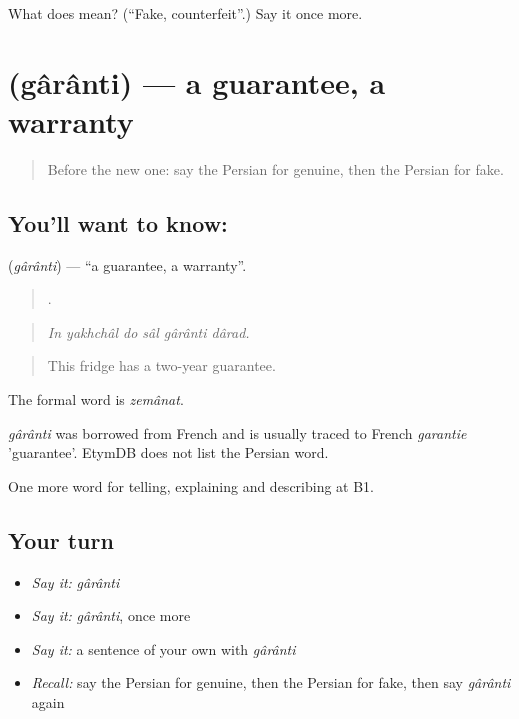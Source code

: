 \begin{tcolorbox}[breakable,colback=teal!4,colframe=teal!35!black,title={Before you move on}]
What does  mean? (\textquotedblleft{}Fake, counterfeit\textquotedblright{}.) Say it once more.
\end{tcolorbox}
\section[\texorpdfstring{\fa{گارانتی} (gârânti)}{گارانتی (gârânti)}]{ (gârânti) — a guarantee, a warranty}

\label{lesson:FA-C459-garanti}



\begin{quote}
Before the new one: say the Persian for genuine, then the Persian for fake.
\end{quote}

\subsection*{You'll want to know: }
\textbf{} (\emph{gârânti}) — \textquotedblleft{}a guarantee, a warranty\textquotedblright{}.

\begin{quote}
     .
\end{quote}

\begin{quote}
\emph{In yakhchâl do sâl gârânti dârad.}
\end{quote}

\begin{quote}
This fridge has a two-year guarantee.
\end{quote}

The formal word is \emph{zemânat}.

\begin{cousinweb}
\emph{gârânti} was borrowed from French and is usually traced to French \emph{garantie} 'guarantee'. EtymDB does not list the Persian word.
\end{cousinweb}

\begin{grammarlens}[title={What you've built}]
One more word for telling, explaining and describing at B1.
\end{grammarlens}

\subsection*{Your turn}
\begin{itemize}
\raggedright
  \item \emph{Say it:} \emph{gârânti}
  \item \emph{Say it:} \emph{gârânti}, once more
  \item \emph{Say it:} a sentence of your own with \emph{gârânti}
  \item \emph{Recall:} say the Persian for genuine, then the Persian for fake, then say \emph{gârânti} again
\end{itemize}

